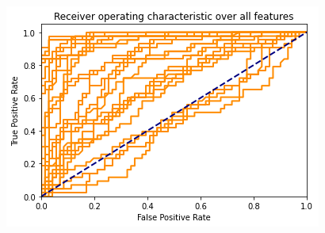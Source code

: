 \documentclass{article}
\begin{document}
\begin{enumerate}
\begin{enumerate}
\begin{figure}[H]
	\end{figure}
	\begin{figure}[H]
		\centering
	\end{figure}
	\begin{figure}[H]
                \centering
                \includegraphics[scale=0.4]{img/roc_all.png}
        \end{figure}


\end{enumerate}
\end{enumerate}
\end{document}
